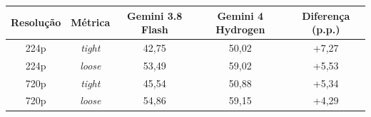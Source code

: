 \begin{tabular}{|c|c|c|c|c|}
\hline
\textbf{Resolução} & \textbf{Métrica} & \textbf{Gemini 3.8 Flash} & \textbf{Gemini 4 Hydrogen} & \textbf{Diferença (p.p.)} \\ \hline
224p & \textit{tight} & 42,75 & 50,02 & +7,27 \\ \hline
224p & \textit{loose} & 53,49 & 59,02 & +5,53 \\ \hline
720p & \textit{tight} & 45,54 & 50,88 & +5,34 \\ \hline
720p & \textit{loose} & 54,86 & 59,15 & +4,29 \\ \hline
\end{tabular}%
